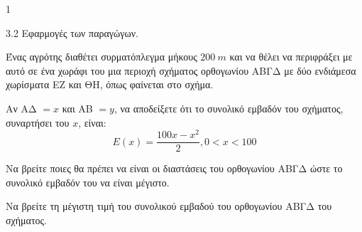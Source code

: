 \begin{ylh}{1}
    \item 3.2 Εφαρμογές των παραγώγων.
\end{ylh}
\begin{center}
\centering
{}
\end{center}
Ένας αγρότης διαθέτει συρματόπλεγμα μήκους $200\ m$ και να θέλει να περιφράξει με αυτό σε ένα χωράφι του μια περιοχή σχήματος ορθογωνίου ΑΒΓΔ με δύο ενδιάμεσα χωρίσματα ΕΖ και ΘΗ, όπως φαίνεται στο σχήμα.
\begin{alist}
    \item Αν ΑΔ $= x$ και ΑΒ $= y$, να αποδείξετε ότι το συνολικό εμβαδόν του σχήματος, συναρτήσει του $x$, είναι:
    \[ E(x) = \frac{100x - x^2}{2}, 0 < x < 100 \]
    \item Να βρείτε ποιες θα πρέπει να είναι οι διαστάσεις του ορθογωνίου ΑΒΓΔ ώστε το συνολικό εμβαδόν του να είναι μέγιστο.
    \item Να βρείτε τη μέγιστη τιμή του συνολικού εμβαδού του ορθογωνίου ΑΒΓΔ του σχήματος.
\end{alist}

